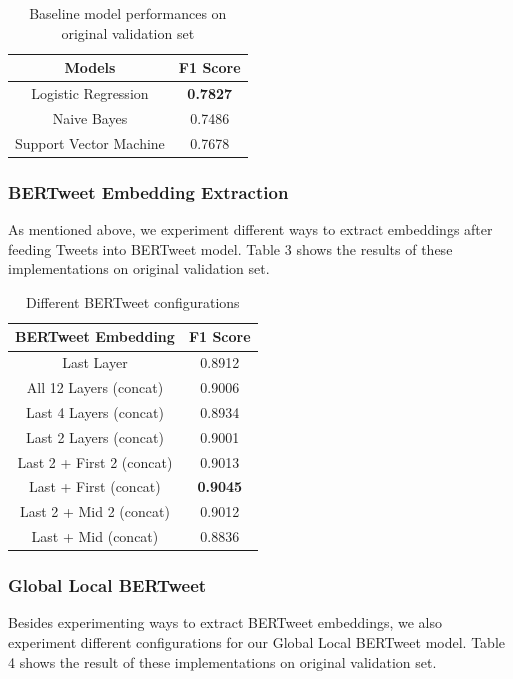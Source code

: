 \documentclass[11pt,a4paper]{article}
\begin{document}
\begin{table}[ht]
    \centering
    \begin{tabular}{|c|c|}
        \hline
        \bf{Models} & \bf{F1 Score} \\\hline
        Logistic Regression & \textbf{0.7827} \\\hline
        Naive Bayes & 0.7486  \\\hline
        Support Vector Machine & 0.7678 \\\hline
    \end{tabular}
    \caption{Baseline model performances on original validation set}
    \label{tab:my_label}
\end{table}


\subsubsection{BERTweet Embedding Extraction}
As mentioned above, we experiment different ways to extract embeddings after feeding Tweets into BERTweet model. Table 3 shows the results of these implementations on original validation set.

\begin{table}[ht]
    \centering
    \begin{tabular}{|c|c|}
        \hline
        \bf{BERTweet Embedding} & \bf{F1 Score} \\\hline
        Last Layer & 0.8912 \\\hline
        All 12 Layers (concat) & 0.9006 \\\hline
        Last 4 Layers (concat) & 0.8934 \\\hline
        Last 2 Layers (concat) & 0.9001 \\\hline
        Last 2 + First 2 (concat) & 0.9013 \\\hline
        Last + First (concat) & \textbf{0.9045} \\\hline
        Last 2 + Mid 2 (concat) & 0.9012 \\\hline
        Last + Mid (concat) & 0.8836 \\\hline
    \end{tabular}
    \caption{Different BERTweet configurations}
    \label{tab:my_label}
\end{table}

\subsubsection{Global Local BERTweet}
Besides experimenting ways to extract BERTweet embeddings, we also experiment different configurations for our Global Local BERTweet model. Table 4 shows the result of these implementations on original validation set.
\end{document}
